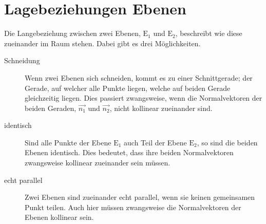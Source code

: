 \documentclass{article}
\begin{document}
 
\newcommand{\vect}[1]{\overrightarrow{#1}}
  
\section{Lagebeziehungen Ebenen}
Die Langebeziehung zwischen zwei Ebenen, $\mathrm{E}_1$ und $\mathrm{E}_2$, beschreibt wie diese zueinander im Raum stehen. Dabei gibt es drei Möglichkeiten.
\begin{description}
 \item[Schneidung] Wenn zwei Ebenen sich schneiden, kommt es zu einer Schnittgerade; der Gerade, auf welcher alle Punkte liegen, welche auf beiden Gerade gleichzeitig liegen. Dies passiert zwangsweise, wenn die Normalvektoren der beiden Geraden, $\vect{n_1}$ und $\vect{n_2}$, nicht kollinear zueinander sind.
 \item[identisch] Sind alle Punkte der Ebene $\mathrm{E}_1$ auch Teil der Ebene $\mathrm{E}_2$, so sind die beiden Ebenen identisch. Dies bedeutet, dass ihre beiden Normalvektoren zwangsweise kollinear zueinander sein müssen.
 \item[echt parallel] Zwei Ebenen sind zueinander echt parallel, wenn sie keinen gemeinsamen Punkt teilen. Auch hier müssen zwangsweise die Normalvektoren der Ebenen kollinear sein.
\end{description}
 
\end{document}
